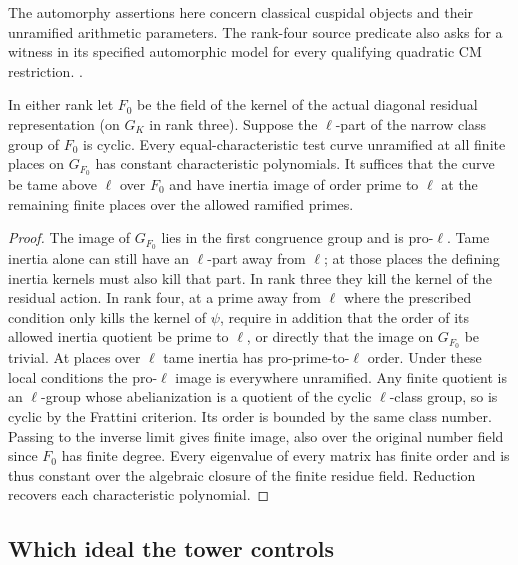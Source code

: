 The automorphy assertions here concern classical cuspidal objects
and their unramified arithmetic parameters. The rank-four source
predicate also asks for a witness in its specified automorphic
model for every qualifying quadratic CM restriction.
.

\begin{lemma}\label{hr:class}
In either rank let \(F_0\) be the field of the kernel of the actual
diagonal residual representation (on \(G_K\) in rank three).
Suppose the \(\ell\)-part of the narrow class group of \(F_0\) is
cyclic. Every equal-characteristic test curve unramified at all finite
places on \(G_{F_0}\) has constant characteristic polynomials.
It suffices that the curve be tame above \(\ell\) over \(F_0\)
and have inertia image of order prime to \(\ell\) at the remaining
finite places over the allowed ramified primes.
\end{lemma}
\begin{proof}
The image of \(G_{F_0}\) lies in the first congruence group and is
pro-\(\ell\). Tame inertia alone can still have an \(\ell\)-part
away from \(\ell\); at those places the defining inertia kernels
must also kill that part. In rank three they kill the kernel of the
residual action. In rank four, at a prime away from \(\ell\) where
the prescribed condition only kills the kernel of \(\psi\), require
in addition that the order of its allowed inertia quotient be
prime to \(\ell\), or directly that the image on \(G_{F_0}\) be
trivial. At places over \(\ell\) tame inertia has pro-prime-to-\(\ell\)
order. Under these local conditions the pro-\(\ell\) image is
everywhere unramified. Any finite quotient is an \(\ell\)-group
whose abelianization is a quotient of the cyclic \(\ell\)-class
group, so is cyclic by the Frattini criterion. Its order is bounded
by the same class number. Passing to the inverse limit gives
finite image, also over the original number field since \(F_0\)
has finite degree. Every eigenvalue of every matrix has finite
order and is thus constant over the algebraic closure of the finite
residue field. Reduction recovers each characteristic polynomial.
\end{proof}

\subsection{Which ideal the tower controls}\label{hr:tower}

